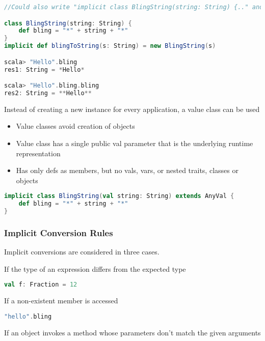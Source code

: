 \begin{lstlisting}[language=scala,mathescape=false]
//Could also write "implicit class BlingString(string: String) {.." and leave the "implicit def ..." away.

class BlingString(string: String) {
    def bling = "*" + string + "*"
}
implicit def blingToString(s: String) = new BlingString(s)

scala> "Hello".bling
res1: String = *Hello*

scala> "Hello".bling.bling
res2: String = **Hello**
\end{lstlisting}

Instead of creating a new instance for every application, a value class
can be used

\begin{itemize}
\tightlist
\item
  Value classes avoid creation of objects
\item
  Value class has a single public val parameter that is the underlying
  runtime representation
\item
  Has only defs as members, but no vals, vars, or nested traits, classes
  or objects
\end{itemize}

\begin{lstlisting}[language=scala,mathescape=false]
implicit class BlingString(val string: String) extends AnyVal {
    def bling = "*" + string + "*"
}
\end{lstlisting}

\hypertarget{implicit-conversion-rules}{%
\subsubsection{Implicit Conversion
Rules}\label{implicit-conversion-rules}}

Implicit conversions are considered in three cases.

If the type of an expression differs from the expected type

\begin{lstlisting}[language=scala,mathescape=false]
val f: Fraction = 12
\end{lstlisting}

If a non-existent member is accessed

\begin{lstlisting}[language=scala,mathescape=false]
"hello".bling
\end{lstlisting}

If an object invokes a method whose parameters don't match the given
arguments


